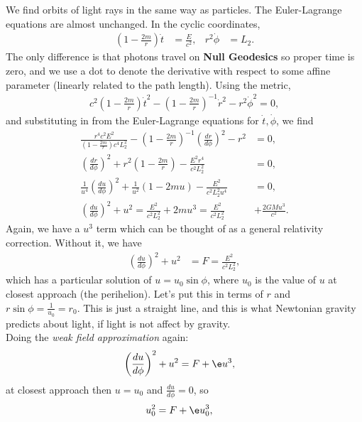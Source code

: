 \documentclass[a4paper, 11pt, normalem]{report}
\begin{document}
We find orbits of light rays in the same way as particles. 
The Euler-Lagrange equations are almost unchanged. 
In the cyclic coordinates, 
\begin{align}
    \left(1-\frac{2m}{r}\right)\dot{t} &= \frac{E}{c^2}, & r^2\dot{\phi} &= L_2. 
\end{align}
The only difference is that photons travel on \textbf{Null Geodesics} so proper time is zero, and we use a dot to denote the derivative with respect to some affine parameter (linearly related to the path length).
Using the metric,
\begin{align}
    c^2\left(1-\frac{2m}{r}\right)\dot{t}^2 - \left(1-\frac{2m}{r}\right)^{-1}\dot{r}^2 - r^2\dot{\phi}^2 = 0, 
\end{align}
and substituting in from the Euler-Lagrange equations for $\dot{t},\dot{\phi}$, we find
\begin{align}
    \frac{r^4c^2E^2}{\left(1-\frac{2m}{r}\right)c^4L_2^2} - \left(1-\frac{2m}{r}\right)^{-1}\left(\frac{dr}{d\phi}\right)^2 - r^2 &= 0,\\
    \left(\frac{dr}{d\phi}\right)^2 + r^2\left(1-\frac{2m}{r}\right) - \frac{E^2r^4}{c^2L_2^2} &= 0,\\
    \frac{1}{u^4}\left(\frac{du}{d\phi}\right)^2 + \frac{1}{u^2}\left(1-2mu\right) - \frac{E^2}{c^2L_2^2u^4} &= 0, \\
    \left(\frac{du}{d\phi}\right)^2 + u^2 = \frac{E^2}{c^2L_2^2} + 2mu^3 = \frac{E^2}{c^2L_2^2} &+ \frac{2GMu^3}{c^2}.
\end{align}
Again, we have a $u^3$ term which can be thought of as a general relativity correction. 
Without it, we have 
\begin{align}
    \left(\frac{du}{d\phi}\right)^2 + u^2 &= F = \frac{E^2}{c^2L_2^2},
\end{align}
which has a particular solution of $u=u_0\sin\phi$, where $u_0$ is the value of $u$ at closest approach (the perihelion). 
Let's put this in terms of $r$ and $r\sin\phi=\frac{1}{u_0}=r_0$.
This is just a straight line, and this is what Newtonian gravity predicts about light, if light is not affect by gravity. \\
Doing the \emph{weak field approximation} again:
\begin{align}
    \left(\frac{du}{d\phi}\right)^2 + u^2 &= F + \e u^3,
\end{align}
at closest approach then $u=u_0$ and $\frac{du}{d\phi}=0$, so
\begin{align}
    u_0^2 &= F + \e u_0^3,
\end{align}
\end{document}
